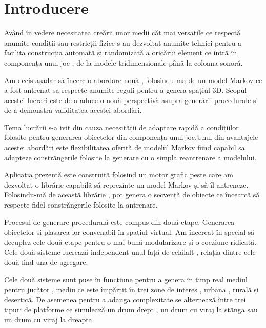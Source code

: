\chapter*{Introducere} 


Având în vedere necesitatea creării unor medii căt mai versatile ce respectă anumite condiții sau restricții fizice s-au dezvoltat anumite tehnici pentru a facilita construcția automată și randomizată a oricărui element ce intră în componența unui joc , de la modele tridimensionale până la coloana sonoră.\par

Am decis așadar să încerc o abordare nouă , folosindu-mă de un model Markov ce a fost antrenat sa respecte anumite reguli pentru a genera spațiul 3D. Scopul acestei lucrări este de a aduce o nouă perspectivă asupra generării procedurale și de a demonstra validitatea acestei abordări.\par

Tema lucrării s-a ivit din cauza necesității de adaptare rapidă a condițiilor folosite pentru generarea obiectelor din componența unui joc.Unul din avantajele acestei abordări este flexibilitatea oferită de modelul Markov fiind capabil sa adapteze constrăngerile folosite la generare cu o simpla reantrenare a modelului.\par

Aplicația prezentă este construită folosind un motor grafic peste care am dezvoltat o librărie capabilă să reprezinte un model Markov și să îl antreneze. Folosindu-mă de această librărie , pot genera o secvență de obiecte ce încearcă să respecte fidel constrăngerile folosite la antrenare.\par

Procesul de generare procedurală este compus din două etape. Generarea obiectelor și plasarea lor convenabil în șpațiul virtual. Am încercat în special să decuplez cele două etape pentru o mai bună modularizare și o coeziune ridicată. Cele două sisteme lucrează independent unul față de celălalt , relația dintre cele două find una de agregare.

Cele două sisteme sunt puse în funcțiune pentru a genera în timp real mediul pentru jucător , mediu ce este împărțit în trei zone de interes , urbana , rurală și desertică. De asemenea pentru a adauga complexitate se alternează între trei tipuri de platforme ce simulează un drum drept , un drum cu viraj la stănga sau un drum cu viraj la dreapta.\par